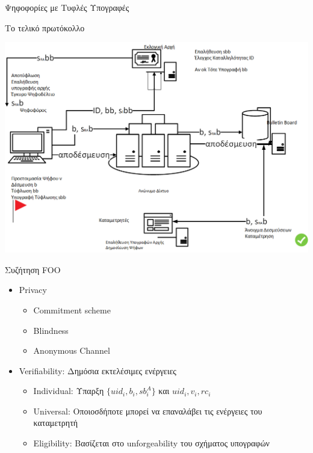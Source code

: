\documentclass[handout]{beamer}
\begin{document}
\begin{section}{Ψηφοφορίες με Τυφλές Υπογραφές}
\begin{frame}{Το τελικό πρωτόκολλο}
    \begin{center}
        \includegraphics[scale=0.35]{foo.PNG}
    \end{center}
\end{frame}

\begin{frame}{Συζήτηση FOO}
\begin{itemize}
\item Privacy
    \begin{itemize}
            \item Commitment scheme
            \item Blindness 
            \item Anonymous Channel
    \end{itemize} \pause
\item Verifiability: Δημόσια εκτελέσιμες ενέργειες
\begin{itemize}
    \item Individual: Υπαρξη $\{ uid_i, b_i, sb_i^A \}$ και $uid_i,v_i,rc_i$
    \item Universal: Οποιοσδήποτε μπορεί να επαναλάβει τις ενέργειες του καταμετρητή 
    \item Eligibility: Βασίζεται στο unforgeability του σχήματος υπογραφών
\end{itemize}
\end{itemize}
\end{frame}


\end{section} 
 
\end{document}
